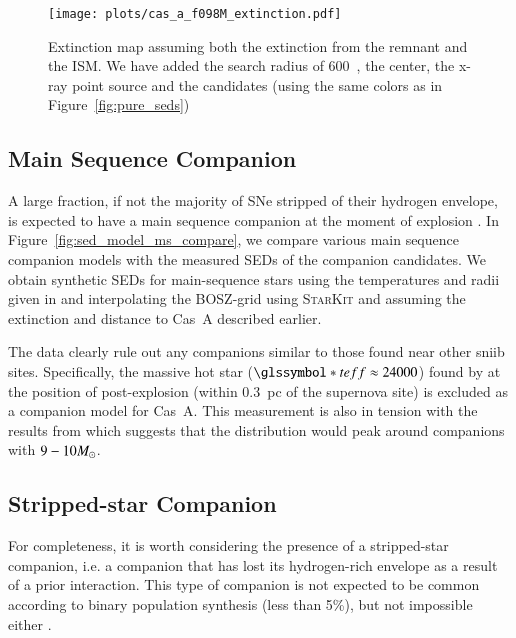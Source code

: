 \documentclass{aa}
\begin{document}
\begin{figure}[h!]
\centering
\texttt{[image: plots/cas\_a\_f098M\_extinction.pdf]}
\caption{Extinction map \citep[using the data from][]{2017MNRAS.465.3309D} assuming both the extinction from the remnant and the ISM. We have added the search radius
of 600~\kms, the center, the x-ray point source and the candidates (using the same colors as in Figure~\ref{fig:pure_seds})}
\label{fig:extinction_map}
\end{figure}


\subsection{Main Sequence Companion}

A large fraction, if not the majority of SNe stripped of their hydrogen envelope, is expected to have a main sequence companion at the moment of explosion \citep[][keeping in mind that the latter looked at all stripped core-collapse supernovae]{2014A&A...563A..83C, 2017ApJ...842..125Z}.
%
In Figure~\ref{fig:sed_model_ms_compare}, we compare various main sequence companion models with the measured SEDs of the companion candidates. We obtain synthetic SEDs for main-sequence stars using the temperatures and radii given in \citet{2007hsaa.book.....Z} and interpolating the BOSZ-grid \citep{2017AJ....153..234B} using \textsc{StarKit} \citep[][]{wolfgang_kerzendorf_2015_28016} and assuming the extinction and distance to Cas~A described earlier.

The data clearly rule out any companions similar to those found near other \gls{sniib} sites. Specifically, the massive hot star ($\teff\approx 24000$) found by \citet[][see also \citealt{2014ApJ...790...17F}]{2004Natur.427..129M} at the position of  post-explosion (within 0.3~pc of the supernova site) is excluded as a companion model for Cas~A. This measurement is also in tension with the results from \citet{2017ApJ...842..125Z} which suggests that the distribution would peak around companions with $9 - 10\hbox{$M_{\odot}$}$. 

\subsection{Stripped-star Companion}

For completeness, it is worth considering the presence of a stripped-star companion, i.e. a companion that has lost its hydrogen-rich envelope as a result of a prior interaction. This type of companion is not expected to be common according to binary population synthesis (less than 5\%), but not impossible either \citep[][]{1994A&A...290..119P, 2017ApJ...842..125Z, 2018arXiv180409164R}.
\end{document}
